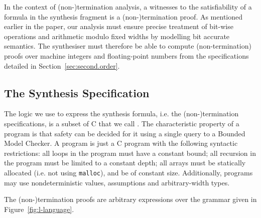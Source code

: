 

In the context of (non-)termination analysis, a witnesses to the satisfiability of a formula in the synthesis fragment 
is a (non-)termination proof. 
As mentioned earlier in the paper, our analysis must ensure precise treatment of bit-wise operations and arithmetic modulo fixed widths
by modelling bit accurate semantics.
The synthesiser must therefore be able to compute (non-termination) proofs 
over machine integers and floating-point numbers from the specifications detailed in Section~\ref{sec:second.order}.






\subsection{The Synthesis Specification}
The logic we use to express the synthesis formula, i.e. the (non-)termination specifications, %
is a subset of C that we call \newC.  
The characteristic property of a \newC  program is that safety can be decided for
it using a single query to a Bounded Model Checker.  A \newC program is
just a C program with the following syntactic restrictions:
 all loops in the program must have a constant bound;
 all recursion in the program must be limited to a constant depth;
 all arrays must be statically allocated (i.e. not using \texttt{malloc}),
 and be of constant size.
Additionally, \newC programs may use nondeterministic values, assumptions
and arbitrary-width types.

The (non-)termination proofs are arbitrary expressions over the grammar given in Figure~\ref{fig:l-language}.  


